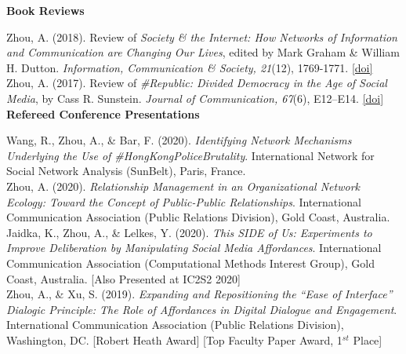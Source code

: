 \documentclass[12pt, letterpaper]{article}
\newcommand{\doi}[1]{\href{#1}{{[doi]}}}
\newcommand{\years}[1]{\marginnote{\normalsize #1}}
\begin{document}
\textbf{Book Reviews}

  \years{[2]} Zhou, A. (2018). Review of \textit{Society \& the Internet: How Networks of Information and Communication are Changing Our Lives}, edited by Mark Graham \& William H. Dutton. \textit{Information, Communication \& Society, 21}(12), 1769-1771. \doi{https://doi.org/10.1080/1369118X.2018.1465577}\\
  \years{[1]} Zhou, A. (2017). Review of \textit{\#Republic: Divided Democracy in the Age of Social Media}, by Cass R. Sunstein. \textit{Journal of Communication, 67}(6), E12–E14. \doi{https://doi.org/10.1111/jcom.12344}\\

\textbf{Refereed Conference Presentations}

\years{[11]} Wang, R., Zhou, A., \& Bar, F. (2020). \textit{Identifying Network Mechanisms Underlying the Use of \#HongKongPoliceBrutality}. International Network for Social Network Analysis (SunBelt), Paris, France.\\
\years{[10]} Zhou, A. (2020). \textit{Relationship Management in an Organizational Network Ecology: Toward the Concept of Public-Public Relationships}. International Communication Association (Public Relations Division), Gold Coast, Australia.\\
\years{[9]} Jaidka, K., Zhou, A., \& Lelkes, Y. (2020). \textit{This SIDE of Us: Experiments to Improve Deliberation by Manipulating Social Media Affordances}. International Communication Association (Computational Methods Interest Group), Gold Coast, Australia. [Also Presented at IC2S2 2020]\\
  \years{[8]} Zhou, A., \& Xu, S. (2019). \textit{Expanding and Repositioning the ``Ease of Interface'' Dialogic Principle: The Role of Affordances in Digital Dialogue and Engagement}. International Communication Association (Public Relations Division), Washington, DC. [Robert Heath Award] [Top Faculty Paper Award, 1$^{st}$ Place]\\
\end{document}
